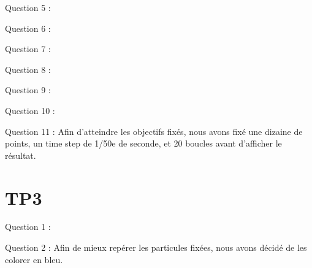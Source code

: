 \documentclass[a4paper,12pt]{article}
\begin{document}
Question 5 : %

Question 6 :%

Question 7 :%

Question 8 :%

Question 9 :%

Question 10 :%


Question 11 : Afin d'atteindre les objectifs fixés, nous avons fixé une dizaine de points, un time step de 1/50e de seconde, et 20 boucles avant d'afficher le résultat.

\section{TP3}

Question 1 :

Question 2 : Afin de mieux repérer les particules fixées, nous avons décidé de les colorer en bleu.
\end{document}
